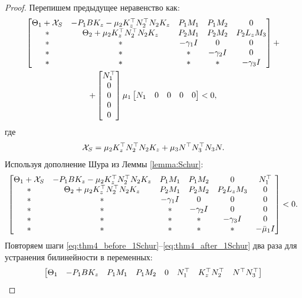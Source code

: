 \begin{proof}
Перепишем предыдущее неравенство как:
	\begin{multline}
		\label{eq:thm4_before_1Schur}
	\begin{bmatrix}
		{\Theta}_1 + \mathcal{X}_{S} & -{P}_1{B}{K}_z -\mu_2{K}_z^\top{N}_2^\top{N}_2{K}_z & {P}_1{M}_1 & {P}_1{M}_2 &0 \\
		* &    {\Theta}_2 + \mu_2{K}_z^\top{N}_2^\top{N}_2{K}_z & {P}_2{M}_1 & {P}_2{M}_2 & {P}_2{L}_z{M}_3\\
		* & * & -\gamma_1{I} & 0&0\\
		* & * & * & -\gamma_2{I}&0 \\
		* & * & * & *&-\gamma_3{I}
	\end{bmatrix} + \\
	+ \begin{bmatrix}
		N_1^\top \\ 0 \\0\\0\\0
	\end{bmatrix} \mu_1
	\begin{bmatrix}
		N_1 & 0 & 0 & 0&0
	\end{bmatrix}
	<0,
\end{multline}
	где
%
\begin{equation}
	\mathcal{X}_{S}=\mu_2{K}_z^\top{N}_2^\top{N}_2{K}_z+\mu_3{N}^\top{N}_3^\top{N}_3{N}.
\end{equation}
Используя дополнение Шура из Леммы \ref{lemma:Schur}:
	\begin{equation}
	\label{eq:thm4_after_1Schur}
	\begin{bmatrix}
		{\Theta}_1 + \mathcal{X}_{S} & -{P}_1{B}{K}_z -\mu_2{K}_z^\top{N}_2^\top{N}_2{K}_z & {P}_1{M}_1 & {P}_1{M}_2 &0 & N_1^\top\\
		* &    {\Theta}_2 + \mu_2{K}_z^\top{N}_2^\top{N}_2{K}_z & {P}_2{M}_1 & {P}_2{M}_2 & {P}_2{L}_z{M}_3 &0\\
		* & * & -\gamma_1{I} & 0&0&0\\
		* & * & * & -\gamma_2{I}&0&0 \\
		* & * & * & *&-\gamma_3{I}&0 \\
			* & * & * & *& *& -\bar{\mu}_1{I}
	\end{bmatrix}
	<0.
\end{equation}
Повторяем шаги \eqref{eq:thm4_before_1Schur}--\eqref{eq:thm4_after_1Schur} два раза для устранения билинейности в переменных:
	\begin{equation}
		\label{eq:thm4_after_Schur}
		\begin{bmatrix}
			{\Theta}_1 & -{P}_1{B}{K}_z & {P}_1{M}_1 & {P}_1{M}_2 & 0 & {N}_1^\top & {K}_z^\top{N}_2^\top & {N}^\top{N}_3^\top 

\end{bmatrix}
\end{equation}
\end{proof}
